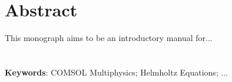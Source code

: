 \chapter*{Abstract}

This monograph aims to be an introductory manual for...
\\
\\
\\
{\bf Keywords}: COMSOL Multiphysics; Helmholtz Equations; ...

 